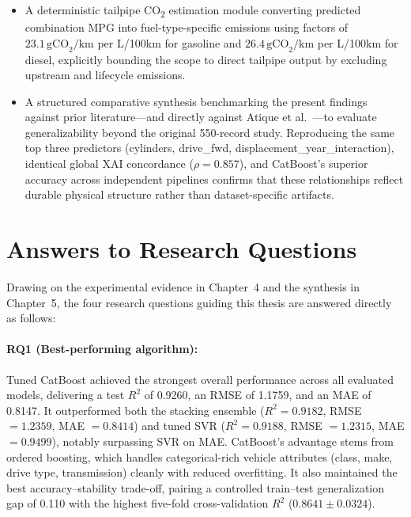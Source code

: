 \begin{itemize}
    \item A deterministic tailpipe CO\textsubscript{2} estimation module converting predicted combination MPG into fuel-type-specific emissions using factors of \(23.1\,\text{gCO}_2/\text{km}\) per L/100km for gasoline and \(26.4\,\text{gCO}_2/\text{km}\) per L/100km for diesel, explicitly bounding the scope to direct tailpipe output by excluding upstream and lifecycle emissions.

    \item A structured comparative synthesis benchmarking the present findings against prior literature---and directly against Atique et al.~\cite{atique2026explainable}---to evaluate generalizability beyond the original 550-record study. Reproducing the same top three predictors (cylinders, drive\_fwd, displacement\_year\_interaction), identical global XAI concordance (\(\rho = 0.857\)), and CatBoost's superior accuracy across independent pipelines confirms that these relationships reflect durable physical structure rather than dataset-specific artifacts.
\end{itemize}


\section{Answers to Research Questions}

Drawing on the experimental evidence in Chapter~4 and the synthesis in Chapter~5, the four research questions guiding this thesis are answered directly as follows:

\paragraph{RQ1 (Best-performing algorithm):}
Tuned CatBoost achieved the strongest overall performance across all evaluated models, delivering a test \(R^2\) of 0.9260, an RMSE of 1.1759, and an MAE of 0.8147. It outperformed both the stacking ensemble (\(R^2 = 0.9182\), RMSE \(= 1.2359\), MAE \(= 0.8414\)) and tuned SVR (\(R^2 = 0.9188\), RMSE \(= 1.2315\), MAE \(= 0.9499\)), notably surpassing SVR on MAE. CatBoost's advantage stems from ordered boosting, which handles categorical-rich vehicle attributes (class, make, drive type, transmission) cleanly with reduced overfitting. It also maintained the best accuracy--stability trade-off, pairing a controlled train--test generalization gap of 0.110 with the highest five-fold cross-validation \(R^2\) (\(0.8641 \pm 0.0324\)).

